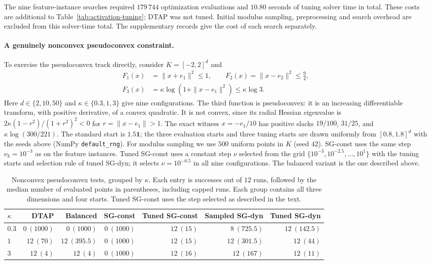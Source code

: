\documentclass[]{interact}
\theoremstyle{plain}
\theoremstyle{definition}
\theoremstyle{remark}
\begin{document}
The nine feature-instance searches required $179\,744$ optimization
evaluations and $10.80$ seconds of tuning solver time in total. These costs
are additional to Table~\ref{tab:activation-tuning}; DTAP was not tuned.
Initial modulus sampling, preprocessing and search overhead are excluded
from this solver-time total. The supplementary records give the cost of
each search separately.

\paragraph*{A genuinely nonconvex pseudoconvex constraint.}
To exercise the pseudoconvex track directly, consider $K=[-2,2]^d$ and
\begin{equation}\label{eq:logball-test}
\begin{aligned}
 F_1(x)&=\|x+e_1\|^2\le1,\qquad
 F_2(x)=\|x-e_2\|^2\le\tfrac94,\\
 F_3(x)&=\kappa\log(1+\|x-e_1\|^2)\le \kappa\log3.
\end{aligned}
\end{equation}
Here $d\in\{2,10,50\}$ and $\kappa\in\{0.3,1,3\}$ give nine configurations.
The third function is pseudoconvex: it is an increasing differentiable
transform, with positive derivative, of a convex quadratic. It is not
convex, since its radial Hessian eigenvalue is
$2\kappa(1-r^2)/(1+r^2)^2<0$ for $r=\|x-e_1\|>1$.
The exact witness $x=-e_1/10$ has positive slacks
$19/100$, $31/25$, and $\kappa\log(300/221)$.
The standard start is $1.5\mathbf1$; the three evaluation starts and three
tuning starts are drawn uniformly from $[0.8,1.8]^d$ with the seeds above
(NumPy \texttt{default\_rng}).
For modulus sampling we use $500$ uniform points in $K$ (seed $42$).
SG-const uses the same step $\nu_k=10^{-3}$ as on the feature instances. Tuned
SG-const uses a constant step $\nu$ selected from the grid
$\{10^{-3},10^{-2.5},\ldots,10^1\}$ with the tuning starts and selection rule of
tuned SG-dyn; it selects $\nu=10^{-0.5}$ in all nine configurations. The balanced
variant is the one described above.

\begin{table}[t]
\centering\small
\setlength{\tabcolsep}{5pt}
\caption{Nonconvex pseudoconvex tests, grouped by $\kappa$.
Each entry is successes out of $12$ runs, followed by the median number
of evaluated points in parentheses, including capped runs. Each group
contains all three dimensions and four starts. Tuned SG-const uses the step
selected as described in the text.}
\label{tab:synthetic-scale}
\begin{tabular}{@{}lrrrrrr@{}}
\toprule
$\kappa$ & DTAP & Balanced & SG-const & Tuned SG-const & Sampled SG-dyn & Tuned SG-dyn\\
\midrule
$0.3$ & $0\ (1000)$ & $0\ (1000)$ & $0\ (1000)$ & $12\ (15)$ & $8\ (725.5)$ & $12\ (142.5)$\\
$1$   & $12\ (70)$ & $12\ (395.5)$ & $0\ (1000)$ & $12\ (15)$ & $12\ (301.5)$ & $12\ (44)$\\
$3$   & $12\ (4)$ & $12\ (4)$ & $0\ (1000)$ & $12\ (16)$ & $12\ (167)$ & $12\ (11)$\\
\bottomrule
\end{tabular}
\end{table}
\end{document}
